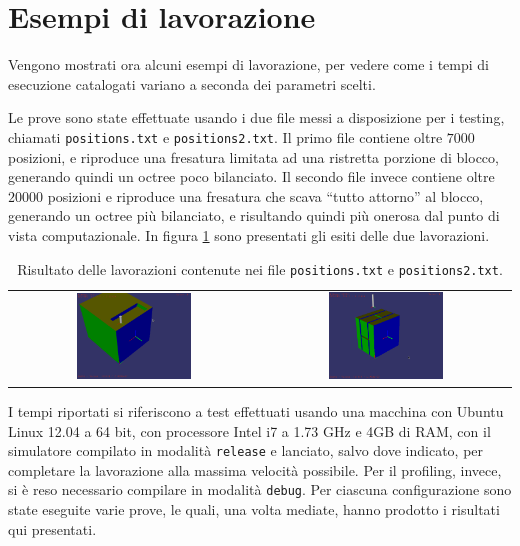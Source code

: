 \section{Esempi di lavorazione}
Vengono mostrati ora alcuni esempi di lavorazione, per vedere come i tempi di esecuzione catalogati variano a seconda dei parametri scelti.

Le prove sono state effettuate usando i due file messi a disposizione per i testing, chiamati \texttt{positions.txt} e \texttt{positions2.txt}. Il primo file contiene oltre $7000$ posizioni, e riproduce una fresatura limitata ad una ristretta porzione di blocco, generando quindi un octree poco bilanciato. Il secondo file invece contiene oltre $20000$ posizioni e riproduce una fresatura che scava ``tutto attorno'' al blocco, generando un octree più bilanciato, e risultando quindi più onerosa dal punto di vista computazionale. In figura \ref{tab:lavfinali} sono presentati gli esiti delle due lavorazioni.
\begin{table}[h]
	\centering
	\begin{tabular}{cc}
	\includegraphics[width=0.48\textwidth]{img/screenshots/pos_box_v05_1.png} &%
	\includegraphics[width=0.48\textwidth]{img/screenshots/pos2_box_v1_2.png}\\
	\end{tabular}
	\caption{Risultato delle lavorazioni contenute nei file \texttt{positions.txt} e \texttt{positions2.txt}.}
	\label{tab:lavfinali}
\end{table}
I tempi riportati si riferiscono a test effettuati usando una macchina con Ubuntu Linux 12.04 a 64 bit, con processore Intel i7 a 1.73 GHz e 4GB di RAM, con il simulatore compilato in modalità \verb!release! e lanciato, salvo dove indicato, per completare la lavorazione alla massima velocità possibile. Per il profiling, invece, si è reso necessario compilare in modalità \verb!debug!. Per ciascuna configurazione sono state eseguite varie prove, le quali, una volta mediate, hanno prodotto i risultati qui presentati.

